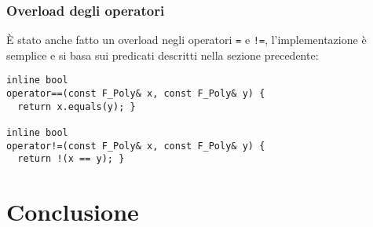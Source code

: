 \documentclass{mimosis}
\theoremstyle{definition}
\begin{document}
\subsection{Overload degli operatori}
\label{sec:orgeab9a73}
È stato anche fatto un overload negli operatori \texttt{=} e \texttt{!=}, l'implementazione è
semplice e si basa sui predicati descritti nella sezione precedente:

\lstset{style=mystyle,language=C++,label= ,caption= ,captionpos=b,numbers=none}
\begin{lstlisting}
inline bool
operator==(const F_Poly& x, const F_Poly& y) {
  return x.equals(y); }

inline bool
operator!=(const F_Poly& x, const F_Poly& y) {
  return !(x == y); }
\end{lstlisting}
\chapter{Conclusione}
\label{sec:org666744f}


\renewcommand\bibname{Bibliografia}

\end{document}
